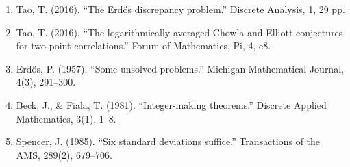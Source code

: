 \begin{enumerate}
\item Tao, T. (2016). ``The Erdős discrepancy problem.'' Discrete Analysis, 1, 29 pp.
\item Tao, T. (2016). ``The logarithmically averaged Chowla and Elliott conjectures for two-point correlations.'' Forum of Mathematics, Pi, 4, e8.
\item Erdős, P. (1957). ``Some unsolved problems.'' Michigan Mathematical Journal, 4(3), 291--300.
\item Beck, J., \& Fiala, T. (1981). ``Integer-making theorems.'' Discrete Applied Mathematics, 3(1), 1--8.
\item Spencer, J. (1985). ``Six standard deviations suffice.'' Transactions of the AMS, 289(2), 679--706.
\end{enumerate}
